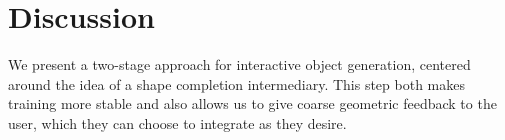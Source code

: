 
\section{Discussion}


We present a two-stage approach for interactive object generation, centered around the idea of a shape completion intermediary. This step both makes training more stable and also allows us to give coarse geometric feedback to the user, which they can choose to integrate as they desire. 





